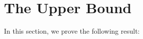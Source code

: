 \documentclass{patmorin}
\DeclareMathOperator{\crs}{cr}
\begin{document}
%
%
%
%
%
%

\section{The Upper Bound}

In this section, we prove the following result:
\end{document}

